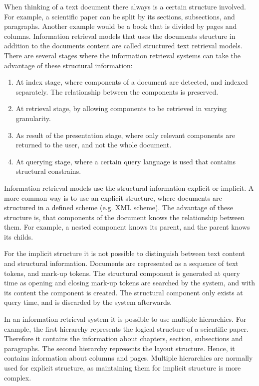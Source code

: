 When thinking of a text document there always is a certain structure involved. For example, a scientific paper can be split by its sections, subsections, and paragraphs. Another example would be a book that is divided by pages and columns. Information retrieval models that uses the documents structure in addition to the documents content are called structured text retrieval models. There are several stages where the information retrieval systems can take the advantage of these structural information:
\begin{enumerate}
  \item At index stage, where components of a document are detected, and indexed separately. The relationship between the components is preserved.
  \item At retrieval stage, by allowing components to be retrieved in varying granularity.
  \item As result of the presentation stage, where only relevant components are returned to the user, and not the whole document.
  \item At querying stage, where a certain query language is used that contains structural constrains.
\end{enumerate}
Information retrieval models use the structural information explicit or implicit. A more common way is to use an explicit structure, where documents are structured in a defined scheme (e.g. XML scheme). The advantage of these structure is, that components of the document knows the relationship between them. For example, a nested component knows its parent, and the parent knows its childs. 

For the implicit structure it is not possible to distinguish between text content and structural information. Documents are represented as a sequence of text tokens, and mark-up tokens. The structural component is generated at query time as opening and closing mark-up tokens are searched by the system, and with its content the component is created. The structural component only exists at query time, and is discarded by the system afterwards.

In an information retrieval system it is possible to use multiple hierarchies. For example, the first hierarchy represents the logical structure of a scientific paper. Therefore it contains the information about chapters, section, subsections and paragraphs. The second hierarchy represents the layout structure. Hence, it contains information about columns and pages. Multiple hierarchies are normally used for explicit structure, as maintaining them for implicit structure is more complex. 

